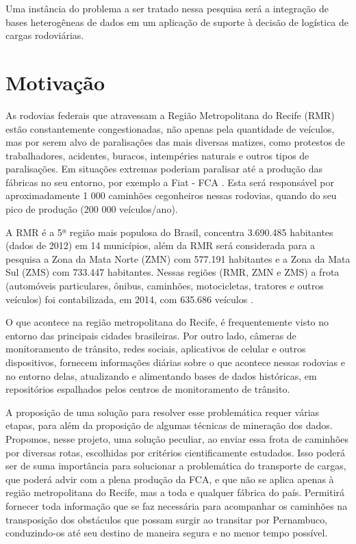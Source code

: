 Uma instância do problema a ser tratado nessa pesquisa será a integração de bases heterogêneas de dados em um aplicação de suporte à decisão de logística de cargas rodoviárias.


\section{ Motivação}\label{intro:motivacao}

As rodovias federais que atravessam a Região Metropolitana do Recife (RMR) estão constantemente congestionadas, não apenas pela 
quantidade de veículos, mas por serem alvo de paralisações das mais diversas matizes, como protestos de trabalhadores, acidentes, 
buracos, intempéries naturais e outros tipos de paralisações. 
Em situações extremas poderiam paralisar até a produção das fábricas no seu entorno, por exemplo a Fiat - FCA \cite{BNDES2013}. 
Esta será responsável por aproximadamente 1 000 caminhões cegonheiros nessas rodovias, quando do seu pico de produção (200 000 veículos/ano).

A RMR é a 5ª região mais populosa do Brasil, concentra 3.690.485 habitantes (dados de 2012) \cite{Bitoun2012} em 14 municípios, além da RMR 
será considerada para a pesquisa a Zona da Mata Norte (ZMN) com 577.191 habitantes e a Zona da Mata Sul (ZMS) com 733.447 habitantes. 
Nessas regiões (RMR, ZMN e ZMS) a frota (automóveis particulares, ônibus, caminhões, motocicletas, tratores e outros veículos) 
foi contabilizada, em 2014, com 635.686 veículos \cite{FrotaVeiculosIBGE}.

O que acontece na região metropolitana do Recife, é frequentemente visto no entorno das principais cidades brasileiras.
Por outro lado, câmeras de monitoramento de trânsito, redes sociais, aplicativos de celular e outros dispositivos, fornecem informações diárias sobre o que acontece nessas 
rodovias e no entorno delas, atualizando e alimentando bases de dados históricas, em repositórios espalhados pelos centros de monitoramento de trânsito.

A proposição de uma solução para resolver esse problemática requer várias etapas, para além da proposição de algumas técnicas de mineração dos dados.
Propomos, nesse projeto, uma solução peculiar, ao enviar essa frota de caminhões por diversas rotas, escolhidas por critérios cientificamente estudados.
Isso poderá ser de suma importância para solucionar a problemática do transporte de cargas, que poderá advir com a plena produção da FCA, e que não se aplica apenas 
à região metropolitana do Recife, mas a toda e qualquer fábrica do país. Permitirá fornecer toda informação que se faz necessária para acompanhar os
caminhões na transposição dos obstáculos que possam surgir ao transitar por Pernambuco, conduzindo-os até seu destino de maneira segura e no menor tempo possível.


